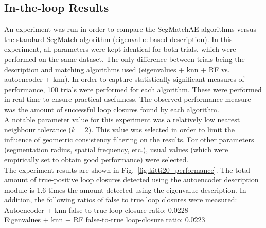 \subsection{In-the-loop Results}

An experiment was run in order to compare the SegMatchAE algorithms versus the standard SegMatch algorithm (eigenvalue-based description). In this experiment, all parameters were kept identical for both trials, which were performed on the same dataset. The only difference between trials being the description and matching algorithms used (eigenvalues + knn + RF vs. autoencoder + knn). In order to capture statistically significant measures of performance, 100 trials were performed for each algorithm. These were performed in real-time to ensure practical usefulness. The observed performance measure was the amount of successful loop closures found by each algorithm.\\ 

A notable parameter value for this experiment was a relatively low nearest neighbour tolerance ($k=2$). This value was selected in order to limit the influence of geometric consistency filtering on the results. For other parameters (segmentation radius, spatial frequency, etc.), usual values (which were empirically set to obtain good performance) were selected.\\

The experiment results are shown in Fig.~\ref{fig:kitti20_performance}. The total amount of true-positive loop closures detected using the autoencoder description module is 1.6 times the amount detected using the eigenvalue description. In addition, the following ratios of false to true loop closures were measured:\\

Autoencoder + knn false-to-true loop-closure ratio: 0.0228\\
Eigenvalues + knn + RF false-to-true loop-closure ratio: 0.0223\\


